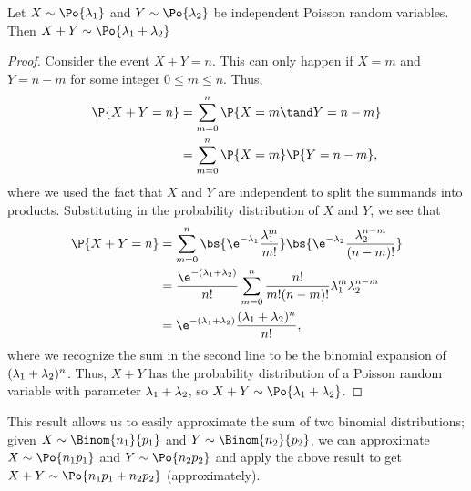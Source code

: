 \begin{proposition}
    Let $X \sim \Po{\l_1}$ and $Y \sim \Po{\l_2}$ be independent Poisson random variables. Then $X + Y \sim \Po{\l_1 + \l_2}$
\end{proposition}
\begin{proof}
    Consider the event $X + Y = n$. This can only happen if $X = m$ and $Y = n - m$ for some integer $0 \leq m \leq n$. Thus,
    \begin{align*}
        \P{X + Y = n} &= \sum_{m = 0}^n \P{X = m \tand Y = n -m}\\
        &= \sum_{m = 0}^n \P{X = m} \P{Y = n -m},
    \end{align*}
    where we used the fact that $X$ and $Y$ are independent to split the summands into products. Substituting in the probability distribution of $X$ and $Y$, we see that
    \begin{align*}
        \P{X + Y = n} &= \sum_{m = 0}^n \bs{\e^{-\l_1} \frac{\l_1^m}{m!}} \bs{\e^{-\l_2} \frac{\l_2^{n-m}}{(n-m)!}}\\
        &= \frac{\e^{-(\l_1 + \l_2)}}{n!} \sum_{m = 0}^n \frac{n!}{m! (n-m)!} \l_1^m \l_2^{n-m}\\
        &= \e^{-(\l_1 + \l_2)} \frac{(\l_1 + \l_2)^n}{n!},
    \end{align*}
    where we recognize the sum in the second line to be the binomial expansion of $(\lambda_1 + \lambda_2)^{n}$. Thus, $X + Y$ has the probability distribution of a Poisson random variable with parameter $\lambda_1 + \lambda_2$, so $X + Y \sim \Po{\l_1 + \l_2}$.
\end{proof}

This result allows us to easily approximate the sum of two binomial distributions; given $X \sim \Binom{n_1}{p_1}$ and $Y \sim \Binom{n_2}{p_2}$, we can approximate $X \sim \Po{n_1 p_1}$ and $Y \sim \Po{n_2 p_2}$ and apply the above result to get $X + Y \sim \Po{n_1 p_1 + n_2 p_2}$ (approximately).


